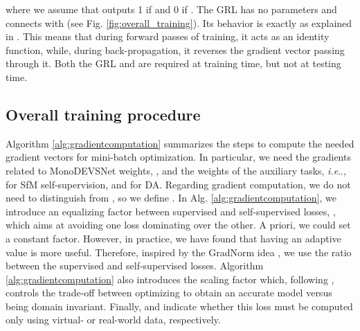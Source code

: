 \documentclass[journal]{IEEEtran}
\makeatletter
\DeclareRobustCommand\onedot{\futurelet\@let@token\@onedot}
\def\@onedot{\ifx\@let@token.\else.\null\fi\xspace}
\def\ie{\emph{i.e}\onedot} \def\Ie{\emph{I.e}\onedot}
\newcommand{\Fig}[1]{Fig. \ref{fig:#1}}
\newcommand{\Eq}[1]{Eq. (\ref{eq:#1})}
\newcommand{\Alg}[1]{Alg. \ref{alg:#1}}
\makeatother
\begin{document}
\noindent where we assume that  outputs 1 if  and 0 if  . The GRL has no parameters and connects  with  (see \Fig{overall_training}). Its behavior is exactly as explained in \cite{Ganin:2015}. This means that during forward passes of training, it acts as an identity function, while, during back-propagation, it reverses the gradient vector passing through it. Both the GRL and  are required at training time, but not at testing time.

\subsection{Overall training procedure} 
\label{ssec:traininprocedure}
Algorithm \ref{alg:gradientcomputation} summarizes the steps to compute the needed gradient vectors for mini-batch optimization. In particular, we need the gradients related to MonoDEVSNet weights, , and the weights of the auxiliary tasks, {\ie},  for SfM self-supervision, and  for DA. Regarding gradient computation, we do not need to distinguish  from , so we define . In \Alg{gradientcomputation}, we introduce an equalizing factor between supervised and self-supervised losses, , which aims at avoiding one loss dominating over the other. A priori, we could set a constant factor. However, in practice, we have found that having an adaptive value is more useful. Therefore, inspired by the GradNorm idea \cite{Chen:2018GradNorm}, we use the ratio between the supervised and self-supervised losses. Algorithm \ref{alg:gradientcomputation} also introduces the scaling factor  which, following \cite{Ganin:2015}, controls the trade-off between optimizing  to obtain an accurate  model versus being domain invariant. Finally,  and  indicate whether this loss must be computed only using virtual- or real-world data, respectively.  

\begin{comment}
\begin{myalg}
\centering
\caption{Computing the gradients , , ,  for a mini-batch .  refers to back-propagation on  with respect to weights .  is the empty set.  is defined in \Eq{sf-loss},  in \Eq{sup-loss}, and  in \Eq{da-loss}.}
\texttt{[image: gradientalgorithm.png]}
\label{alg:gradientcomputation}
\end{myalg}
\end{comment}
\end{document}
